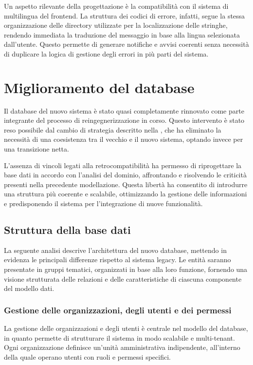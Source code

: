 Un aspetto rilevante della progettazione è la compatibilità con il sistema di multilingua del frontend. La struttura dei codici di errore, infatti, segue la stessa organizzazione delle directory utilizzate per la localizzazione delle stringhe, rendendo immediata la traduzione del messaggio in base alla lingua selezionata dall'utente. Questo permette di generare notifiche e avvisi coerenti senza necessità di duplicare la logica di gestione degli errori in più parti del sistema.

\section{Miglioramento del database}
Il database del nuovo sistema è stato quasi completamente rinnovato come parte integrante del processo di reingegnerizzazione in corso. Questo intervento è stato reso possibile dal cambio di strategia descritto nella , che ha eliminato la necessità di una coesistenza tra il vecchio e il nuovo sistema, optando invece per una transizione netta.

L’assenza di vincoli legati alla retrocompatibilità ha permesso di riprogettare la base dati in accordo con l’analisi del dominio, affrontando e risolvendo le criticità presenti nella precedente modellazione. Questa libertà ha consentito di introdurre una struttura più coerente e scalabile, ottimizzando la gestione delle informazioni e predisponendo il sistema per l’integrazione di nuove funzionalità.

\subsection{Struttura della base dati}
La seguente analisi descrive l'architettura del nuovo database, mettendo in evidenza le principali differenze rispetto al sistema legacy. Le entità saranno presentate in gruppi tematici, organizzati in base alla loro funzione, fornendo una visione strutturata delle relazioni e delle caratteristiche di ciascuna componente del modello dati.

\subsubsection{Gestione delle organizzazioni, degli utenti e dei permessi}
La gestione delle organizzazioni e degli utenti è centrale nel modello del database, in quanto permette di strutturare il sistema in modo scalabile e multi-tenant. Ogni organizzazione definisce un'unità amministrativa indipendente, all'interno della quale operano utenti con ruoli e permessi specifici.

